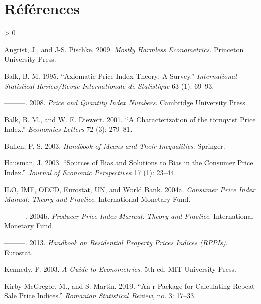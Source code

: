 \documentclass[
]{article}
\newlength{\cslhangindent}
\newenvironment{CSLReferences}[2] %
 {%
  \setlength{\parindent}{0pt}
  \ifodd #1 \everypar{\setlength{\hangindent}{\cslhangindent}}\ignorespaces\fi
  \ifnum #2 > 0
  \setlength{\parskip}{#2\baselineskip}
  \fi
 }%
 {}
\begin{document}
\hypertarget{ruxe9fuxe9rences}{%
\section*{Références}\label{ruxe9fuxe9rences}}

\hypertarget{refs}{}
\begin{CSLReferences}{1}{0}
\leavevmode\hypertarget{ref-angrist2009}{}%
Angrist, J., and J-S. Pischke. 2009. \emph{Mostly Harmless Econometrics}. Princeton University Press.

\leavevmode\hypertarget{ref-balk1995}{}%
Balk, B. M. 1995. {``Axiomatic Price Index Theory: A Survey.''} \emph{International Statistical Review/Revue Internationale de Statistique} 63 (1): 69--93.

\leavevmode\hypertarget{ref-balk2008}{}%
---------. 2008. \emph{Price and Quantity Index Numbers}. Cambridge University Press.

\leavevmode\hypertarget{ref-balk2001}{}%
Balk, B. M., and W. E. Diewert. 2001. {``A Characterization of the t{ö}rnqvist Price Index.''} \emph{Economics Letters} 72 (3): 279--81.

\leavevmode\hypertarget{ref-bullen2003}{}%
Bullen, P. S. 2003. \emph{Handbook of Means and Their Inequalities}. Springer.

\leavevmode\hypertarget{ref-hausman2003}{}%
Hausman, J. 2003. {``Sources of Bias and Solutions to Bias in the Consumer Price Index.''} \emph{Journal of Economic Perspectives} 17 (1): 23--44.

\leavevmode\hypertarget{ref-cpimanual}{}%
ILO, IMF, OECD, Eurostat, UN, and World Bank. 2004a. \emph{Consumer Price Index Manual: Theory and Practice}. International Monetary Fund.

\leavevmode\hypertarget{ref-ppimanual}{}%
---------. 2004b. \emph{Producer Price Index Manual: Theory and Practice}. International Monetary Fund.

\leavevmode\hypertarget{ref-rppihandbook}{}%
---------. 2013. \emph{Handbook on Residential Property Prices Indices ({RPPIs})}. Eurostat.

\leavevmode\hypertarget{ref-kennedy2003}{}%
Kennedy, P. 2003. \emph{A Guide to Econometrics}. 5th ed. MIT University Press.

\leavevmode\hypertarget{ref-kirbymcgregor2019}{}%
Kirby-McGregor, M., and S. Martin. 2019. {``An r Package for Calculating Repeat-Sale Price Indices.''} \emph{Romanian Statistical Review}, no. 3: 17--33.


\end{CSLReferences}
\end{document}

